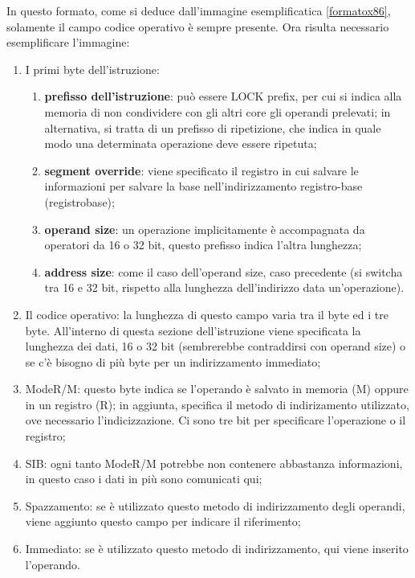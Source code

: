 \documentclass{article}
\begin{document}
In questo formato, come si deduce dall'immagine esemplificatica \autoref{formatox86}, solamente il campo codice operativo è sempre presente. Ora risulta necessario esemplificare l'immagine:
\begin{enumerate}

\item I primi byte dell'istruzione:
\begin{enumerate}
	\item \textbf{prefisso dell'istruzione}: può essere LOCK prefix, per cui si indica alla memoria di non condividere con gli altri core gli operandi prelevati; in alternativa, si tratta di un prefisso di ripetizione, che indica in quale modo una determinata operazione deve essere ripetuta;

	\item \textbf{segment override}: viene specificato il registro in cui salvare le informazioni per salvare la base nell'indirizzamento registro-base (registrobase);

	\item \textbf{operand size}: un operazione implicitamente è accompagnata da operatori da 16 o 32 bit, questo prefisso indica l'altra lunghezza;

	\item \textbf{address size}: come il caso dell'operand size, caso precedente (si switcha tra 16 e 32 bit, rispetto alla lunghezza dell'indirizzo data un'operazione).
\end{enumerate}

\item Il codice operativo: la lunghezza di questo campo varia tra il byte ed i tre byte. All'interno di questa sezione dell'istruzione viene specificata la lunghezza dei dati, 16 o 32 bit (sembrerebbe contraddirsi con operand size) o se c'è bisogno di più byte per un indirizzamento immediato;

\item ModeR/M: questo byte indica se l'operando è salvato in memoria (M) oppure in un registro (R); in aggiunta, specifica il metodo di indirizamento utilizzato, ove necessario l'indicizzazione. Ci sono tre bit per specificare l'operazione o il registro;

\item SIB: ogni tanto ModeR/M potrebbe non contenere abbastanza informazioni, in questo caso i dati in più sono comunicati qui;

\item Spazzamento: se è utilizzato questo metodo di indirizzamento degli operandi, viene aggiunto questo campo per indicare il riferimento;

\item Immediato: se è utilizzato questo metodo di indirizzamento, qui viene inserito l'operando.
\end{enumerate}
\end{document}
